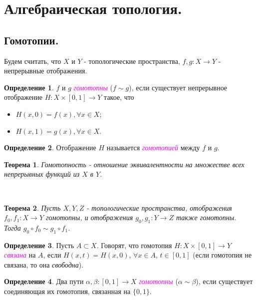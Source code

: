 \documentclass[a4paper,100pt]{article}
\theoremstyle{indented}
\newtheorem{theorem}{Теорема}
\theoremstyle{definition}
\newtheorem{defn}{Определение}
\theoremstyle{remark}
\DeclareMathOperator{\ra}{\rightarrow}
\begin{document}
\section{Алгебраическая топология.}

\subsection{Гомотопии.}

Будем считать, что $X$ и $Y$ - топологические пространства, $f, g: X \ra Y$ - непрерывные отображения.

\begin{defn}
    $f$ и $g$ \textit{\textcolor{magenta}{\hypertarget{s107}{гомотопны}}} ($f \sim g$), если существует непрерывное отображение $H: X \times [0, 1] \ra Y$ такое, что 

    \begin{itemize}
        \item $H(x, 0) = f(x), \forall x \in X$; 
        \item $H(x, 1) = g(x), \forall x \in X$. 
    \end{itemize}
\end{defn}

\begin{defn}
    Отображение $H$ называется  \textit{\textcolor{magenta}{\hypertarget{s108}{гомотопией}}} между $f$ и $g$. 
\end{defn}

\begin{theorem}
    Гомотопность - отношение эквивалентности на множестве всех непрерывных функций из $X$ в $Y$. 
\end{theorem} \ 

\begin{theorem}
    Пусть $X, Y, Z$ - топологические пространства, отображения $f_0, f_1: X \ra Y$ гомотопны, и отображения $g_0, g_1: Y \ra Z$ также гомотопны. Тогда $g_0 \circ f_0 \sim g_1 \circ f_1$.
\end{theorem}

\begin{defn}
    Пусть $A \subset X$. Говорят, что гомотопия $H: X \times [0, 1] \ra Y$ \textit{\textcolor{magenta}{\hypertarget{s109}{связана}}} на $A$, если $H(x, t) = H(x, 0)$, $\forall x \in A$, $t \in [0, 1]$ (если гомотопия не связана, то она \textit{свободна}). 
\end{defn}

\begin{defn}
    Два пути $\alpha, \beta: [0, 1] \ra X$ \textit{\textcolor{magenta}{\hypertarget{s110}{гомотопны}}} ($\alpha \sim \beta$), если существует соединяющая их гомотопия, связанная на $\{0, 1\}$.
\end{defn}
\end{document}
